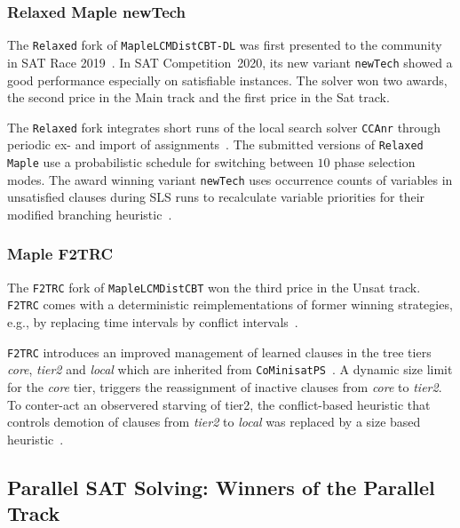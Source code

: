 \documentclass{elsarticle}
\newcommand{\solver}[1]{\texttt{#1}}
\begin{document}
\subsubsection{Relaxed Maple newTech}

The \solver{Relaxed} fork of \solver{MapleLCMDistCBT-DL} was first presented to the community in SAT Race 2019~\cite{Xindi:SC2019}. 
In SAT Competition~2020, its new variant \solver{newTech} showed a good performance especially on satisfiable instances. 
The solver won two awards, the second price in the Main track and the first price in the Sat track.

The \solver{Relaxed} fork integrates short runs of the local search solver \solver{CCAnr} through periodic ex- and import of assignments~\cite{Xindi:SC2019}. 
The submitted versions of \solver{Relaxed Maple} use a probabilistic schedule for switching between $10$ phase selection modes. 
The award winning variant \solver{newTech} uses occurrence counts of variables in unsatisfied clauses during SLS runs to recalculate variable priorities for their modified branching heuristic~\cite{Xindi:SC2020}. 


\subsubsection{Maple F2TRC}

The \solver{F2TRC} fork of \solver{MapleLCMDistCBT} won the third price in the Unsat track. 
\solver{F2TRC} comes with a deterministic reimplementations of former winning strategies, e.g., by replacing time intervals by conflict intervals~\cite{Kochemazov:SC2020}. 

\solver{F2TRC} introduces an improved management of learned clauses in the tree tiers \emph{core}, \emph{tier2} and \emph{local} which are inherited from \solver{CoMinisatPS}~\cite{Oh:2015:satunsat}.
A dynamic size limit for the \emph{core} tier, triggers the reassignment of inactive clauses from \emph{core} to \emph{tier2}. 
To conter-act an observered starving of tier2, the conflict-based heuristic that controls demotion of clauses from \emph{tier2} to \emph{local} was replaced by a size based heuristic~\cite{Kochemazov:SC2020}. 


\subsection{Parallel SAT Solving: Winners of the Parallel Track}
\label{sec:part:par}
\end{document}
